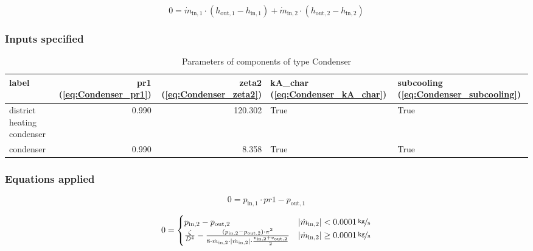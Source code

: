 \begin{equation}
\label{eq:Condenser_energy_balance_constraints}
0 = \dot{m}_\mathrm{in,1} \cdot \left(h_\mathrm{out,1} - h_\mathrm{in,1} \right) +\dot{m}_\mathrm{in,2} \cdot \left(h_\mathrm{out,2} - h_\mathrm{in,2} \right)
\end{equation}


\subsubsection{Inputs specified}

\begin{table}[H]\begin{center}
\begin{tabular}{lrrll}
\toprule
                      label &  pr1 (\ref{eq:Condenser_pr1}) &  zeta2 (\ref{eq:Condenser_zeta2}) &  kA\_char (\ref{eq:Condenser_kA_char}) &  subcooling (\ref{eq:Condenser_subcooling}) \\
\midrule
 district heating condenser &                         0.990 &                           120.302 &                                   True &                                        True \\
                  condenser &                         0.990 &                             8.358 &                                   True &                                        True \\
\bottomrule
\end{tabular}
\caption{Parameters of components of type Condenser}
\end{center}\end{table}

\subsubsection{Equations applied}

\begin{equation}
\label{eq:Condenser_pr1}
0=p_\mathrm{in,1}\cdot pr1 - p_\mathrm{out,1}
\end{equation}

\begin{equation}
\label{eq:Condenser_zeta2}
0 = \begin{cases}
p_\mathrm{in,2}- p_\mathrm{out,2} & |\dot{m}_\mathrm{in,2}| < \unitfrac[0.0001]{kg}{s} \\
\frac{\zeta}{D^4}-\frac{(p_\mathrm{in,2}-p_\mathrm{out,2})\cdot\pi^2}{8\cdot\dot{m}_\mathrm{in,2}\cdot|\dot{m}_\mathrm{in,2}|\cdot\frac{v_\mathrm{in,2} + v_\mathrm{out,2}}{2}}& |\dot{m}_\mathrm{in,2}| \geq \unitfrac[0.0001]{kg}{s}
\end{cases}
\end{equation}

